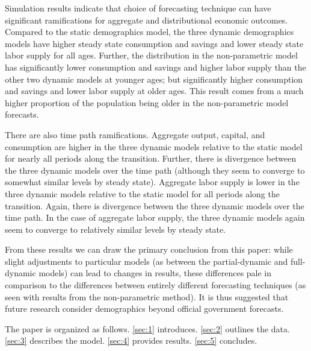 \documentclass[10pt]{article}
\renewcommand{\thesection}{\arabic{section}}
\renewcommand{\section}[2][]{\oldsection[#1]{#2}\index{#1}\label{sec:\thesection}}
\numberwithin{equation}{subsection}
\begin{document}
\par Simulation results indicate that choice of forecasting technique can have significant ramifications for aggregate and distributional economic outcomes. Compared to the static demographics model, the three dynamic demographics models have higher steady state consumption and savings and lower steady state labor supply for all ages. Further, the distribution in the non-parametric model has significantly lower consumption and savings and higher labor supply than the other two dynamic models at younger ages; but significantly higher consumption and savings and lower labor supply at older ages. This result comes from a much higher proportion of the population being older in the non-parametric model forecasts.

\par There are also time path ramifications. Aggregate output, capital, and consumption are higher in the three dynamic models relative to the static model for nearly all periods along the transition. Further, there is divergence between the three dynamic models over the time path (although they seem to converge to somewhat similar levels by steady state). Aggregate labor supply is lower in the three dynamic models relative to the static model for all periods along the transition. Again, there is divergence between the three dynamic models over the time path. In the case of aggregate labor supply, the three dynamic models again seem to converge to relatively similar levels by steady state.

\par From these results we can draw the primary conclusion from this paper: while slight adjustments to particular models (as between the partial-dynamic and full-dynamic models) can lead to changes in results, these differences pale in comparison to the differences between entirely different forecasting techniques (as seen with results from the non-parametric method). It is thus suggested that future research consider demographics beyond official government forecasts.

\par The paper is organized as follows. \autoref{sec:1} introduces. \autoref{sec:2} outlines the data. \autoref{sec:3} describes the model. \autoref{sec:4} provides results. \autoref{sec:5} concludes.

\end{document}
